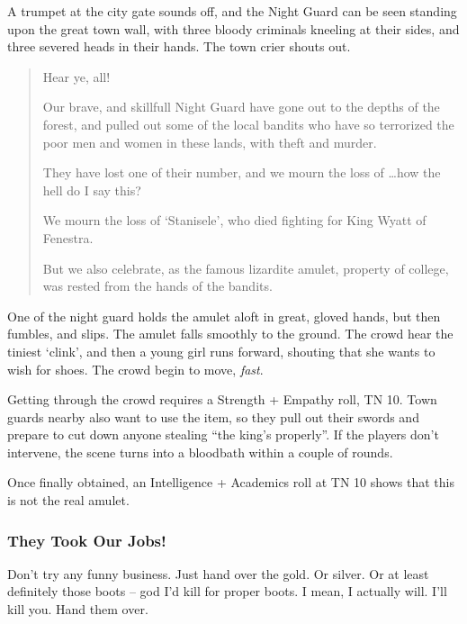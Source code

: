 \begin{boxtext}
	A trumpet at the city gate sounds off, and the Night Guard can be seen standing upon the great town wall, with three bloody criminals kneeling at their sides, and three severed heads in their hands.  The town crier shouts out.

	\begin{quotation}
		Hear ye, all!

		Our brave, and skillfull Night Guard have gone out to the depths of the forest, and pulled out some of the local bandits who have so terrorized the poor men and women in these lands, with theft and murder.

		They have lost one of their number, and we mourn the loss of \ldots how the hell do I say this?

		We mourn the loss of `Stanisele', who died fighting for King Wyatt of Fenestra.

		But we also celebrate, as the famous lizardite amulet, property of \gls{college}, was rested from the hands of the bandits.
	\end{quotation}

	One of the night guard holds the amulet aloft in great, gloved hands, but then fumbles, and slips.  The amulet falls smoothly to the ground.  The crowd hear the tiniest `clink', and then a young girl runs forward, shouting that she wants to wish for shoes.  The crowd begin to move, \emph{fast}.
\end{boxtext}

Getting through the crowd requires a Strength + Empathy roll, TN 10.  Town guards nearby also want to use the item, so they pull out their swords and prepare to cut down anyone stealing ``the king's properly''.  If the players don't intervene, the scene turns into a bloodbath within a couple of rounds.

Once finally obtained, an Intelligence + Academics roll at TN 10 shows that this is not the real amulet.

\subsubsection{They Took Our Jobs!}

\begin{speechtext}
	Don't try any funny business.  Just hand over the gold. Or silver.  Or at least definitely those boots -- god I'd kill for proper boots.  I mean, I actually will.  I'll kill you.  Hand them over.
\end{speechtext}

